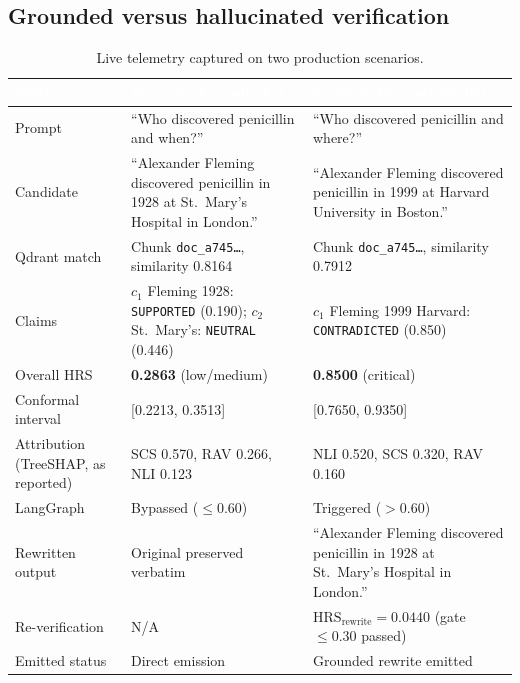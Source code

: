 \documentclass[11pt,a4paper]{article}
\newcommand{\hc}[1]{\textcolor{white}{\textbf{#1}}}
\newcommand{\hdrrow}{\rowcolor{primarynavy}}
\begin{document}
\subsection{Grounded versus hallucinated verification}
\begin{table}[!htbp]
\centering\small
\renewcommand{\arraystretch}{1.2}
\begin{tabularx}{\linewidth}{@{}L{3.1cm} Y Y@{}}
\hdrrow \hc{Metric} & \hc{Scenario A: grounded} & \hc{Scenario B: contradicted}\\
\toprule
Prompt & ``Who discovered penicillin and when?'' & ``Who discovered penicillin and where?''\\
Candidate & ``Alexander Fleming discovered penicillin in 1928 at St.\ Mary's Hospital in London.'' & ``Alexander Fleming discovered penicillin in 1999 at Harvard University in Boston.''\\
Qdrant match & Chunk \texttt{doc\_a745\dots}, similarity 0.8164 & Chunk \texttt{doc\_a745\dots}, similarity 0.7912\\
Claims & $c_1$ Fleming 1928: \texttt{SUPPORTED} (0.190); $c_2$ St.\ Mary's: \texttt{NEUTRAL} (0.446) & $c_1$ Fleming 1999 Harvard: \texttt{CONTRADICTED} (0.850)\\
Overall HRS & \textbf{0.2863} (low/medium) & \textbf{0.8500} (critical)\\
Conformal interval & [0.2213, 0.3513] & [0.7650, 0.9350]\\
Attribution (TreeSHAP, as reported) & SCS 0.570, RAV 0.266, NLI 0.123 & NLI 0.520, SCS 0.320, RAV 0.160\\
LangGraph & Bypassed ($\le0.60$) & Triggered ($>0.60$)\\
Rewritten output & Original preserved verbatim & ``Alexander Fleming discovered penicillin in 1928 at St.\ Mary's Hospital in London.''\\
Re-verification & N/A & $\mathrm{HRS}_{\text{rewrite}}=\mathbf{0.0440}$ (gate $\le0.30$ passed)\\
Emitted status & Direct emission & Grounded rewrite emitted\\
\bottomrule
\end{tabularx}
\caption{Live telemetry captured on two production scenarios.}
\label{tab:telemetry_table}
\end{table}
\end{document}
